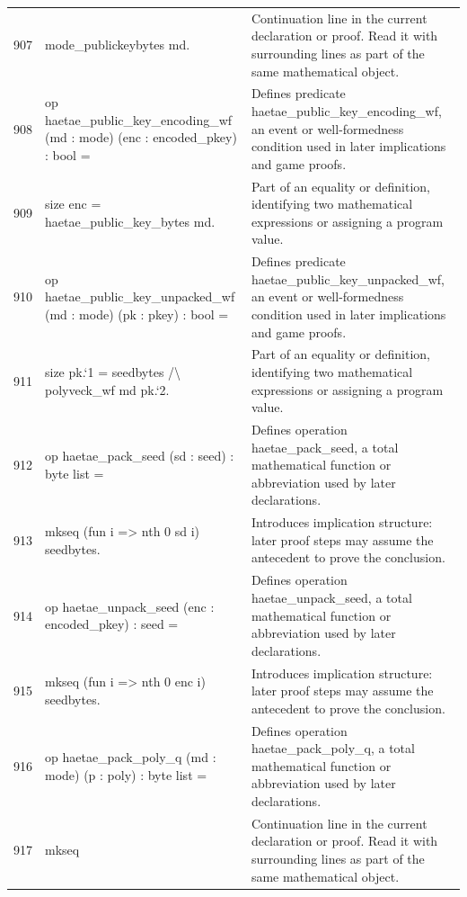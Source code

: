 \documentclass[10pt]{article}
\begin{document}
\begin{longtable}{r L{0.53\textwidth} L{0.37\textwidth}}
907 & {\ttfamily\scriptsize   mode\_publickeybytes md.} & Continuation line in the current declaration or proof.  Read it with surrounding lines as part of the same mathematical object. \\
908 & {\ttfamily\scriptsize op haetae\_public\_key\_encoding\_wf (md : mode) (enc : encoded\_pkey) : bool =} & Defines predicate haetae\_public\_key\_encoding\_wf, an event or well-formedness condition used in later implications and game proofs. \\
909 & {\ttfamily\scriptsize   size enc = haetae\_public\_key\_bytes md.} & Part of an equality or definition, identifying two mathematical expressions or assigning a program value. \\
910 & {\ttfamily\scriptsize op haetae\_public\_key\_unpacked\_wf (md : mode) (pk : pkey) : bool =} & Defines predicate haetae\_public\_key\_unpacked\_wf, an event or well-formedness condition used in later implications and game proofs. \\
911 & {\ttfamily\scriptsize   size pk.`1 = seedbytes /\textbackslash{} polyveck\_wf md pk.`2.} & Part of an equality or definition, identifying two mathematical expressions or assigning a program value. \\
912 & {\ttfamily\scriptsize op haetae\_pack\_seed (sd : seed) : byte list =} & Defines operation haetae\_pack\_seed, a total mathematical function or abbreviation used by later declarations. \\
913 & {\ttfamily\scriptsize   mkseq (fun i => nth 0 sd i) seedbytes.} & Introduces implication structure: later proof steps may assume the antecedent to prove the conclusion. \\
914 & {\ttfamily\scriptsize op haetae\_unpack\_seed (enc : encoded\_pkey) : seed =} & Defines operation haetae\_unpack\_seed, a total mathematical function or abbreviation used by later declarations. \\
915 & {\ttfamily\scriptsize   mkseq (fun i => nth 0 enc i) seedbytes.} & Introduces implication structure: later proof steps may assume the antecedent to prove the conclusion. \\
916 & {\ttfamily\scriptsize op haetae\_pack\_poly\_q (md : mode) (p : poly) : byte list =} & Defines operation haetae\_pack\_poly\_q, a total mathematical function or abbreviation used by later declarations. \\
917 & {\ttfamily\scriptsize   mkseq} & Continuation line in the current declaration or proof.  Read it with surrounding lines as part of the same mathematical object. \\

\end{longtable}
\end{document}
